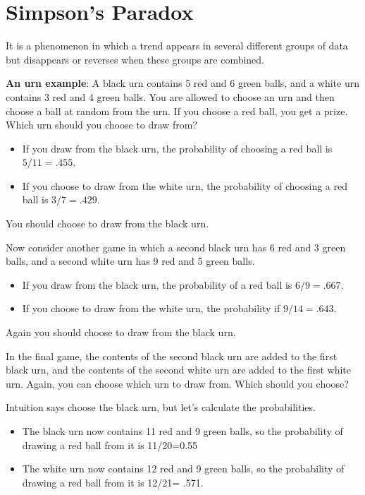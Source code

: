 \hypertarget{simpsons-paradox}{%
\section{Simpson's Paradox}\label{simpsons-paradox}}

It is a phenomenon in which a trend appears in several different
groups of data but disappears or reverses when these groups are
combined.

\textbf{An urn example}: A black urn contains 5 red and 6 green balls,
and a white urn contains 3 red and 4 green balls. You are allowed to
choose an urn and then choose a ball at random from the urn. If you
choose a red ball, you get a prize. Which urn should you choose to
draw from?

\begin{itemize}
\item If you draw from the black urn, the probability of choosing a
  red ball is $5/11 = .455$.
\item If you choose to draw from the white urn, the probability of
  choosing a red ball is $3/7 = .429$.
\end{itemize}

You should choose to draw from the black urn.

Now consider another game in which a second black urn has 6 red and
3 green balls, and a second white urn has 9 red and 5 green balls.

\begin{itemize}
\item If you draw from the black urn, the probability of a red ball is
  $6/9 = .667$.
\item If you choose to draw from the white urn, the probability if
  $9/14 = .643$.
\end{itemize}

Again you should choose to draw from the black urn.

In the final game, the contents of the second black urn are added to
the first black urn, and the contents of the second white urn are
added to the first white urn. Again, you can choose which urn to draw
from. Which should you choose?

Intuition says choose the black urn, but let's calculate the
probabilities.

\begin{itemize}
\item The black urn now contains 11 red and 9 green balls, so the
  probability of drawing a red ball from it is 11/20=0.55
\item The white urn now contains 12 red and 9 green balls, so the
  probability of drawing a red ball from it is 12/21= .571.
\end{itemize}

